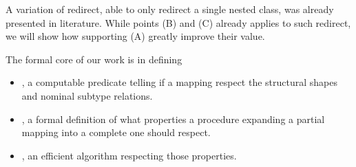 A variation of redirect, able to only redirect a single nested class, was already presented in literature.
While points (B) and (C) already applies to such redirect,
we will show how supporting (A) greatly improve their value.

The formal core of our work is in defining 
\begin{itemize}
\item \Q@ValidRedirect@, a computable predicate telling if a mapping respect the structural shapes and
nominal subtype relations.
\item \Q@BestRedirect@, a formal definition of what properties a procedure 
expanding a partial mapping into a complete one should respect.
\item \Q@ChoseRedirect@, an efficient algorithm respecting those properties.
\end{itemize}

